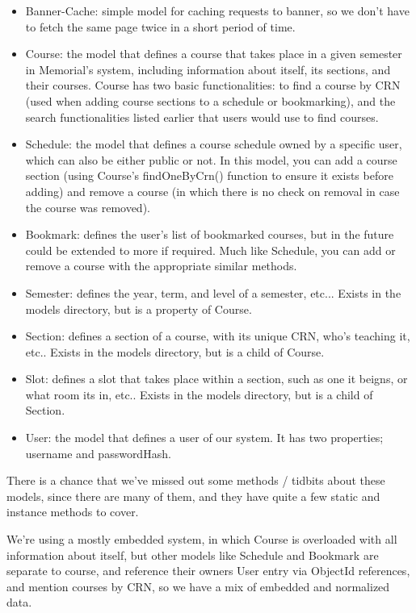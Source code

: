 \documentclass[12pt]{article}
\begin{document}
    \begin{itemize}
    	\item Banner-Cache: simple model for caching requests to banner, so we don’t have to fetch the same page twice in a short period of time.
    	\item Course: the model that defines a course that takes place in a given semester in Memorial’s system, including information about itself, its sections, and their courses. Course has two basic functionalities: to find a course by CRN (used when adding course sections to a schedule or bookmarking), and the search functionalities listed earlier that users would use to find courses.
    	\item Schedule: the model that defines a course schedule owned by a specific user, which can also be either public or not. In this model, you can add a course section (using Course’s findOneByCrn() function to ensure it exists before adding) and remove a course (in which there is no check on removal in case the course was removed).
    	\item Bookmark: defines the user’s list of bookmarked courses, but in the future could be extended to more if required. Much like Schedule, you can add or remove a course with the appropriate similar methods.
    	\item Semester: defines the year, term, and level of a semester, etc... Exists in the models directory, but is a property of Course.
    	\item Section: defines a section of a course, with its unique CRN, who's teaching it, etc.. Exists in the models directory, but is a child of Course.
        \item Slot: defines a slot that takes place within a section, such as one it beigns, or what room its in, etc.. Exists in the models directory, but is a child of Section.
        \item User: the model that defines a user of our system. It has two properties; username and passwordHash.
    \end{itemize}
    
    There is a chance that we've missed out some methods / tidbits about these models, since there are many of them, and they have quite a few static and instance methods to cover.
    
    We’re using a mostly embedded system, in which Course is overloaded with all information about itself, but other models like Schedule and Bookmark are separate to course, and reference their owners User entry via ObjectId references, and mention courses by CRN, so we have a mix of embedded and normalized data.
    
\end{document}

